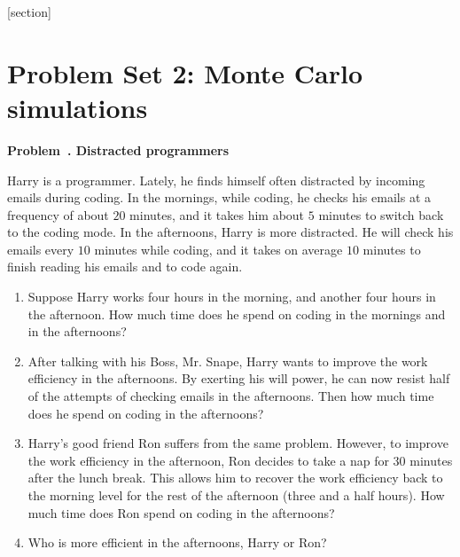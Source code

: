 \documentclass[12pt]{article}
\begin{document}
[section]
\newenvironment{problem}[1]
{
  \refstepcounter{problem}\par\bigskip
  \textbf{\large Problem~\theproblem. #1}
  \par\medskip
}
{ \medskip }





\section{Problem Set 2: Monte Carlo simulations}


\begin{problem}{Distracted programmers}


Harry is a programmer.
%
Lately, he finds himself often distracted by
incoming emails during coding.
%
In the mornings,
while coding,
he checks his emails at a frequency of about $20$ minutes,
and it takes him about $5$ minutes to switch back to
the coding mode.
%
In the afternoons, Harry is more distracted.
%
He will check his emails every $10$ minutes while coding,
and it takes on average $10$ minutes
to finish reading his emails and to code again.

\begin{enumerate}
  \item
    Suppose Harry works four hours in the morning,
    and another four hours in the afternoon.
    How much time does he spend on coding
    in the mornings and in the afternoons?

  \item
    After talking with his Boss, Mr. Snape,
    Harry wants to improve the work efficiency
    in the afternoons.
    By exerting his will power,
    he can now resist half of the attempts of checking emails
    in the afternoons.
    Then how much time does he spend on coding
    in the afternoons?

  \item
    Harry's good friend Ron
    suffers from the same problem.
    However,
    to improve the work efficiency in the afternoon,
    Ron decides to take a nap for $30$ minutes
    after the lunch break.
    This allows him to recover the work efficiency
    back to the morning level
    for the rest of the afternoon
    (three and a half hours).
    How much time does Ron spend on coding
    in the afternoons?

  \item
    Who is more efficient in the afternoons, Harry or Ron?
\end{enumerate}

\end{problem}
\end{document}
